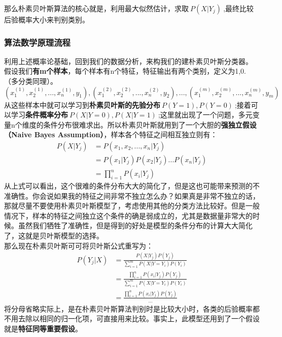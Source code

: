 那么朴素贝叶斯算法的核心就是，利用最大似然估计，求取$~P(X|Y_j)~$,最终比较后验概率大小来判别类别。
\subsubsection{算法数学原理流程}
利用上述概率论基础，回到我们的数据分析，来构我们的建朴素贝叶斯分类器。\\
假设我们\textbf{有m个样本}，每个样本有n个特征，特征输出有两个类别，定义为1,0.（多分类同理）。
$$(x_1^{(1)},x_2^{(1)},...,x_n^{(1)},y_1),(x_1^{(2)},x_2^{(2)},...,x_n^{(2)},y_2),...,(x_1^{(m)},x_2^{(m)},...,x_n^{(m)},y_m)$$
从这些样本中就可以学习到\textbf{朴素贝叶斯的先验分布}$~P(Y=1),P(Y=0)~$;接着可以学习\textbf{条件概率分布}$~P(X|Y=0),P(X|Y=1)~$;这里就出现了一个问题，多元变量n个维度的条件分布很难求出。所以朴素贝叶斯就用到了一个大胆的\textbf{强独立假设（Naive Bayes Assumption）}，样本各个特征之间相互独立则有：
\begin{equation}\nonumber
\begin{split}
  P(X|Y_j)&=P(x_1,x_2,...,x_n|Y_j)\\
            &=P(x_1|Y_j)P(x_2|Y_j)...P(x_n|Y_j)\\
            &=\prod_{i=1}^{n}P(x_i|Y_j)
\end{split}
\end{equation}
从上式可以看出，这个很难的条件分布大大的简化了，但是这也可能带来预测的不准确性。你会说如果我的特征之间非常不独立怎么办？如果真是非常不独立的话，那就尽量不要使用朴素贝叶斯模型了，考虑使用其他的分类方法比较好。但是一般情况下，样本的特征之间独立这个条件的确是弱成立的，尤其是数据量非常大的时候。虽然我们牺牲了准确性，但是得到的好处是模型的条件分布的计算大大简化了，这就是贝叶斯模型的选择。\\
那么现在朴素贝叶斯可可将贝叶斯公式重写为：
\begin{equation}\nonumber
\begin{split}
  P(Y_j|X)&=\frac{P(X|Y_j)P(Y_j)}{\sum_{i=1}^{m}P(X|Y=Y_i)P(Y_i)}\\
          &=\frac{\prod_{i=1}^{n}P(x_i|Y_j)P(Y_j)}{\sum_{i=1}^{m}P(X|Y=Y_i)P(Y_i)}\\
          &=\frac{\prod_{i=1}^{n}P(x_i|Y_j)P(Y_j)}{...}
\end{split}
\end{equation}
将分母省略实际上，是在朴素贝叶斯算法判别时是比较大小时，各类的后验概率都不用去除以相同的归一化项，可直接用来比较。事实上，此模型还用到了一个假设就是\textbf{特征同等重要假设}。


